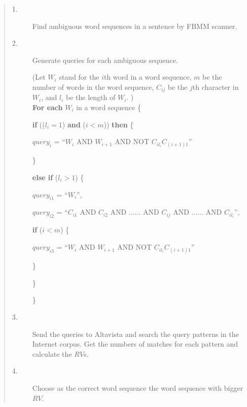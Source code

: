 \begin{quote}
\setlength{\baselineskip}{13pt}


\begin{description}
\item [1.]	Find ambiguous word sequences in a sentence by FBMM scanner.

\item [2.]	Generate queries for each ambiguous sequence. 

   (Let $W_{i}$ stand for the $i$th word in a word sequence, $m$ be the number of words in the word 
    sequence, $C_{ij}$ be the $j$th character in $W_{i}$, and $l_{i}$ be the length of $W_{i}$. )\\

{\bf For each} $W_{i}$ in a word sequence \{

\hspace*{1zw}      {\bf if} (($l_{i} = 1$) {\bf and} ($i < m$)) {\bf then} \{

\hspace*{2zw}         ${query}_{i}$ = ``$W_{i}$ AND $W_{i+1}$ AND NOT $C_{il_{i}}C_{(i+1)1}$''

\hspace*{1zw}      \}

\hspace*{1zw}      {\bf else if} ($l_{i} > 1$) \{

\hspace*{2zw}         ${query}_{i1}$  = ``$W_{i}$'',

\hspace*{2zw}         ${query}_{i2}$  = ``$C_{i1}$ AND $C_{i2}$ AND ...... AND $C_{ij}$ AND ...... AND $C_{il_{i}}$'',

\hspace*{2zw}         {\bf if} ($i < m$) \{

\hspace*{3zw}            ${query}_{i3}$  = ``$W_{i}$ AND $W_{i+1}$ AND NOT $C_{il_{i}}C_{(i+1)1}$''

\hspace*{2zw}         \}

\hspace*{1zw}      \}

\}\\

\item [3.]	Send the queries to Altavista and search the query patterns in the Internet corpus. Get the numbers of matches for each pattern and calculate the $RV$s.

\item [4.]	Choose as the correct word sequence the word sequence with bigger $RV$.  
\end{description}

\end{quote}

